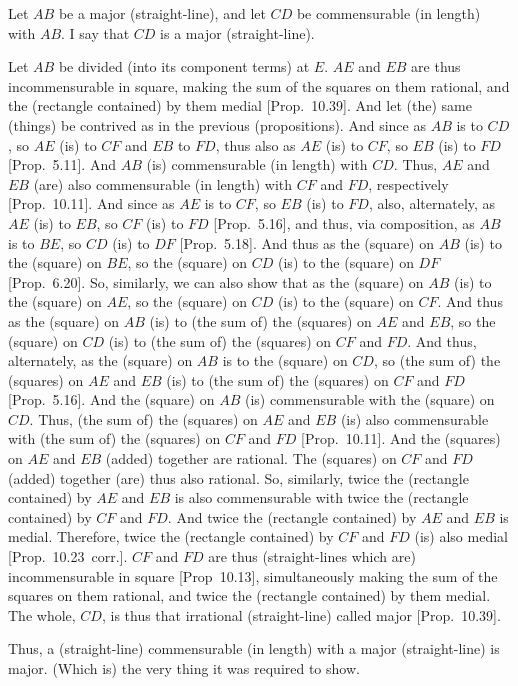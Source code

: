 \begin{Parallel}{}{}
{\epsfysize=0.7in 
\centerline{}

Let $AB$ be a major (straight-line), and let $CD$ be commensurable (in
length) with $AB$. I say that $CD$ is a major (straight-line).

Let $AB$ be divided (into its component terms) at $E$.
$AE$ and $EB$ are thus incommensurable in square, making the sum
of the squares on them rational, and the (rectangle contained) by them
medial [Prop.~10.39]. And let (the) same (things) be contrived as in the previous (propositions). And since
as $AB$ is to $CD$, so $AE$ (is) to $CF$ and $EB$ to $FD$, 
thus also as $AE$ (is) to $CF$, so $EB$ (is) to $FD$ [Prop.~5.11]. And $AB$ (is) commensurable
(in length) with $CD$. Thus, $AE$ and $EB$ (are) also commensurable
(in length) with $CF$ and $FD$, respectively [Prop.~10.11].  And since as $AE$ is to $CF$, so
$EB$ (is) to $FD$, also, alternately, as $AE$ (is) to $EB$, so
$CF$ (is) to $FD$ [Prop.~5.16], and thus, via composition, as $AB$ is to $BE$, so $CD$ (is) to $DF$ [Prop.~5.18]. And thus as the (square) on $AB$
(is) to the (square) on $BE$, so the (square) on $CD$ (is) to the (square)
on $DF$ [Prop.~6.20]. So, similarly, we can also show that as the (square) on $AB$ (is) to the (square) on $AE$, so the
(square) on $CD$ (is) to the (square) on $CF$. And thus as the (square)
on $AB$ (is) to (the sum of) the (squares) on $AE$ and $EB$, so
the (square) on $CD$ (is) to (the sum of) the (squares) on $CF$ and $FD$.
And thus, alternately, as the (square) on $AB$ is to the (square) on $CD$,
so (the sum of) the (squares) on $AE$ and $EB$ (is) to (the sum of)
the (squares) on $CF$ and $FD$ [Prop.~5.16]. And the (square) on $AB$
(is) commensurable with the (square) on $CD$. Thus, (the sum of) the
(squares) on $AE$ and $EB$ (is) also commensurable with (the sum of)
the (squares) on $CF$ and $FD$ [Prop.~10.11]. 
And the (squares) on $AE$ and $EB$ (added) together are rational.
The (squares) on $CF$ and $FD$ (added) together (are) thus also
rational. So, similarly, twice the (rectangle contained) by $AE$ and
$EB$ is also commensurable with twice the (rectangle contained)
by $CF$ and $FD$. And twice the (rectangle contained) by $AE$ and $EB$
is medial. Therefore, twice the (rectangle contained) by $CF$ and
$FD$ (is) also medial [Prop.~10.23~corr.]. 
$CF$ and $FD$ are thus (straight-lines which are) incommensurable in square [Prop~10.13], simultaneously making the sum of the
squares on them rational, and twice the (rectangle contained) by them medial.
The whole, $CD$, is thus that irrational (straight-line) called major
[Prop.~10.39].

Thus, a (straight-line) commensurable (in length) with a major
(straight-line) is major. (Which is) the very thing it was required to show.}
\end{Parallel}

